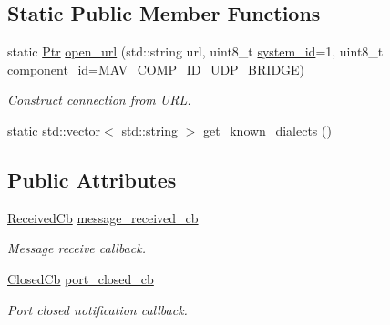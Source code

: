 \subsection*{Static Public Member Functions}
\begin{DoxyCompactItemize}
\item 
static \mbox{\hyperlink{group__mavconn_gaff41078b805e1d8f85ed6fd2d87711ce}{Ptr}} \mbox{\hyperlink{group__mavconn_gad7b5a25103f1421a63839a1aa0f080dc}{open\+\_\+url}} (std\+::string url, uint8\+\_\+t \mbox{\hyperlink{setHome_8cpp_a83150acb88d810ae6864b4c125324ed6}{system\+\_\+id}}=1, uint8\+\_\+t \mbox{\hyperlink{setHome_8cpp_adc84285d5da2c4fa9721d0a32d5e41a7}{component\+\_\+id}}=M\+A\+V\+\_\+\+C\+O\+M\+P\+\_\+\+I\+D\+\_\+\+U\+D\+P\+\_\+\+B\+R\+I\+D\+GE)
\begin{DoxyCompactList}\small\item\em Construct connection from U\+RL. \end{DoxyCompactList}\item 
static std\+::vector$<$ std\+::string $>$ \mbox{\hyperlink{group__mavconn_ga443165dafa8e6827e340e92768a07a12}{get\+\_\+known\+\_\+dialects}} ()
\end{DoxyCompactItemize}
\subsection*{Public Attributes}
\begin{DoxyCompactItemize}
\item 
\mbox{\hyperlink{group__mavconn_ga1d04ead963f1685f3aaf4b18ffb49ff7}{Received\+Cb}} \mbox{\hyperlink{group__mavconn_ga47d4ac1fa3ceb8797164b56c517f1ff8}{message\+\_\+received\+\_\+cb}}
\begin{DoxyCompactList}\small\item\em Message receive callback. \end{DoxyCompactList}\item 
\mbox{\hyperlink{group__mavconn_ga6eef19e745c84f9b0b85d704b2e3e430}{Closed\+Cb}} \mbox{\hyperlink{group__mavconn_gaf00411ca9b9fbe3329804f22755dee05}{port\+\_\+closed\+\_\+cb}}
\begin{DoxyCompactList}\small\item\em Port closed notification callback. \end{DoxyCompactList}\end{DoxyCompactItemize}
